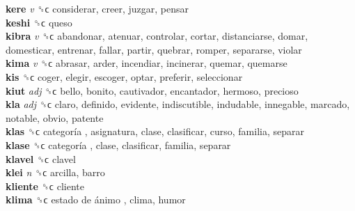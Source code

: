 \textbf{kere} \emph{v}  ␝ϲ  considerar, creer, juzgar, pensar  \\
\textbf{keshi} ␝ϲ  queso  \\
\textbf{kibra} \emph{v}  ␝ϲ  abandonar, atenuar, controlar, cortar, distanciarse, domar, domesticar, entrenar, fallar, partir, quebrar, romper, separarse, violar  \\
\textbf{kima} \emph{v}  ␝ϲ  abrasar, arder, incendiar, incinerar, quemar, quemarse  \\
\textbf{kis} ␝ϲ  coger, elegir, escoger, optar, preferir, seleccionar  \\
\textbf{kiut} \emph{adj}  ␝ϲ  bello, bonito, cautivador, encantador, hermoso, precioso  \\
\textbf{kla} \emph{adj}  ␝ϲ  claro, definido, evidente, indiscutible, indudable, innegable, marcado, notable, obvio, patente  \\
\textbf{klas} ␝ϲ   categoría , asignatura, clase, clasificar, curso, familia, separar  \\
\textbf{klase} ␝ϲ   categoría , clase, clasificar, familia, separar  \\
\textbf{klavel} ␝ϲ  clavel  \\
\textbf{klei} \emph{n}  ␝ϲ  arcilla, barro  \\
\textbf{kliente} ␝ϲ  cliente  \\
\textbf{klima} ␝ϲ   estado de ánimo , clima, humor  \\
